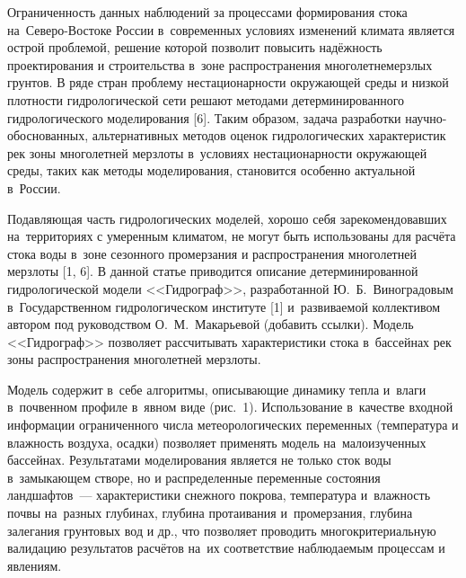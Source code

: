  

\makeProcTitle
{}

Ограниченность данных наблюдений за процессами формирования стока на~Северо-Востоке России в~современных условиях изменений климата является острой проблемой, решение которой позволит повысить надёжность проектирования и строительства в~зоне распространения многолетнемерзлых грунтов. В ряде стран проблему нестационарности окружающей среды и низкой плотности гидрологической сети решают методами детерминированного гидрологического моделирования [6]. Таким образом, задача разработки научно-обоснованных, альтернативных методов оценок гидрологических характеристик рек зоны многолетней мерзлоты в~условиях нестационарности окружающей среды, таких как методы моделирования, становится особенно актуальной в~России.

Подавляющая часть гидрологических моделей, хорошо себя зарекомендовавших на~территориях с умеренным климатом, не могут быть использованы для расчёта стока воды в~зоне сезонного промерзания и распространения многолетней мерзлоты [1, 6]. В данной статье приводится описание детерминированной гидрологической модели <<Гидрограф>>, разработанной Ю.~Б.~Виноградовым в~Государственном гидрологическом институте [1] и~развиваемой коллективом автором под руководством О.~М.~Макарьевой (добавить ссылки). Модель <<Гидрограф>> позволяет рассчитывать характеристики стока в~бассейнах рек зоны распространения многолетней мерзлоты.

Модель содержит в~себе алгоритмы, описывающие динамику тепла и~влаги в~почвенном профиле в~явном виде (рис.~1). Использование в~качестве входной информации ограниченного числа метеорологических переменных (температура и влажность воздуха, осадки) позволяет применять модель на~малоизученных бассейнах. Результатами моделирования является не только сток воды в~замыкающем створе, но и распределенные переменные состояния ландшафтов~--- характеристики снежного покрова, температура и~влажность почвы на~разных глубинах, глубина протаивания и~промерзания, глубина залегания грунтовых вод и др., что позволяет проводить многокритериальную валидацию результатов расчётов на~их соответствие наблюдаемым процессам и явлениям.


